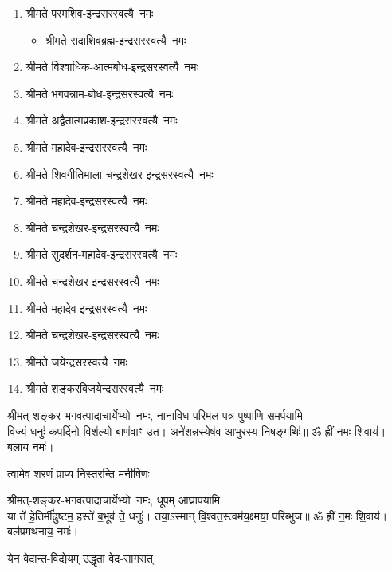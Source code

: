 \begin{center}
\begin{flushleft}
\begin{enumerate}
\item श्रीमते परमशिव-इन्द्रसरस्वत्यै~नमः
\begin{itemize}%
\item श्रीमते सदाशिवब्रह्म-इन्द्रसरस्वत्यै~नमः
\end{itemize}
\item श्रीमते विश्वाधिक-आत्मबोध-इन्द्रसरस्वत्यै~नमः
\item श्रीमते भगवन्नाम-बोध-इन्द्रसरस्वत्यै~नमः
\item श्रीमते अद्वैतात्मप्रकाश-इन्द्रसरस्वत्यै~नमः
\item श्रीमते महादेव-इन्द्रसरस्वत्यै~नमः
\item श्रीमते शिवगीतिमाला-चन्द्रशेखर-इन्द्रसरस्वत्यै~नमः
\item श्रीमते महादेव-इन्द्रसरस्वत्यै~नमः
\item श्रीमते चन्द्रशेखर-इन्द्रसरस्वत्यै~नमः
\item श्रीमते सुदर्शन-महादेव-इन्द्रसरस्वत्यै~नमः
\item श्रीमते चन्द्रशेखर-इन्द्रसरस्वत्यै~नमः
\item श्रीमते महादेव-इन्द्रसरस्वत्यै~नमः
\item श्रीमते चन्द्रशेखर-इन्द्रसरस्वत्यै~नमः
\item श्रीमते जयेन्द्रसरस्वत्यै~नमः
\item श्रीमते शङ्करविजयेन्द्रसरस्वत्यै~नमः
\end{enumerate}

    \end{flushleft}



श्रीमत्-शङ्कर-भगवत्पादाचार्येभ्यो~नमः, नानाविध-परिमल-पत्र-पुष्पाणि समर्पयामि।\\


विज्यं॒ धनुः॑ कप॒र्दिनो॒ विश॑ल्यो॒ बाण॑वाꣳ उ॒त। अने॑शन्न॒\-स्येष॑व आ॒भुर॑स्य निष॒ङ्गथिः॑॥ ॐ ह्रीं न॒मः शि॒वाय॑। बला॑य॒ नमः॑। 

{त्वामेव शरणं प्राप्य निस्तरन्ति मनीषिणः}

श्रीमत्-शङ्कर-भगवत्पादाचार्येभ्यो~नमः, धूपम् आघ्रापयामि।\\


या ते॑ हे॒तिर्मी॑ढुष्टम॒ हस्ते॑ ब॒भूव॑ ते॒ धनुः॑। तया॒ऽस्मान् वि॒श्वत॒स्त्वम॑य॒क्ष्मया॒ परि॑ब्भुज॥ ॐ ह्रीं न॒मः शि॒वाय॑। बल॑प्रमथनाय॒ नमः॑। 

{येन वेदान्त-विद्येयम् उद्धृता वेद-सागरात्}


\end{center}
